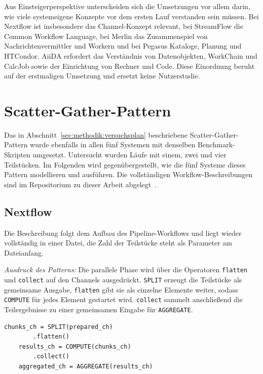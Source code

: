 Aus Einsteigerperspektive unterscheiden sich die Umsetzungen vor
allem darin, wie viele systemeigene Konzepte vor dem ersten Lauf
verstanden sein müssen. Bei Nextflow ist insbesondere das Channel-Konzept relevant, bei StreamFlow die Common Workflow Language, bei Merlin das
Zusammenspiel von Nachrichtenvermittler und Workern und bei Pegasus
Kataloge, Planung und HTCondor. AiiDA erfordert das Verständnis von
Datenobjekten, WorkChain und CalcJob sowie der Einrichtung von
Rechner und Code. Diese Einordnung beruht auf der erstmaligen
Umsetzung und ersetzt keine Nutzerstudie.


\section{Scatter-Gather-Pattern}
\label{sec:lokal:scattergather}

Das in Abschnitt~\ref{sec:methodik:versuchsplan} beschriebene
Scatter-Gather-Pattern wurde ebenfalls in allen fünf Systemen mit
denselben Benchmark-Skripten umgesetzt. Untersucht wurden Läufe mit
einem, zwei und vier Teilstücken. Im Folgenden wird
gegenübergestellt, wie die fünf Systeme dieses Pattern modellieren
und ausführen. Die vollständigen Workflow-Beschreibungen sind im
Repositorium zu dieser Arbeit abgelegt~\cite{barepo}.

\subsection{Nextflow}
\label{sec:lokal:sg:nextflow}

Die Beschreibung folgt dem Aufbau des Pipeline-Workflows und liegt
wieder vollständig in einer Datei, die Zahl der Teilstücke steht als
Parameter am Dateianfang.

\emph{Ausdruck des Patterns:} Die parallele Phase wird über die
Operatoren \texttt{flatten} und \texttt{collect} auf den Channels
ausgedrückt. \texttt{SPLIT} erzeugt die Teilstücke als gemeinsame
Ausgabe, \texttt{flatten} gibt sie als einzelne Elemente weiter,
sodass \texttt{COMPUTE} für jedes Element gestartet wird.
\texttt{collect} sammelt anschließend die Teilergebnisse zu einer
gemeinsamen Eingabe für \texttt{AGGREGATE}.

\begin{lstlisting}[caption={Fan-out und Fan-in im workflow-Block (Nextflow, Scatter-Gather)},label={lst:sg:nf}]
    chunks_ch = SPLIT(prepared_ch)
        .flatten()
    results_ch = COMPUTE(chunks_ch)
        .collect()
    aggregated_ch = AGGREGATE(results_ch)
\end{lstlisting}

